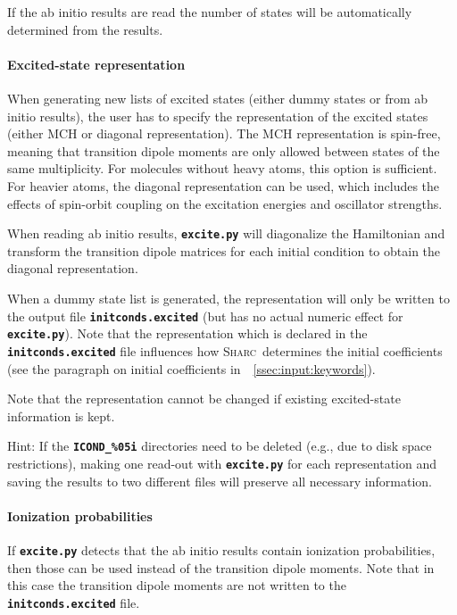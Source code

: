 \documentclass[a4paper,11pt,DIV=15,openany,twoside=false]{scrbook}
\newcommand{\sharc}{\textsc{Sharc}}
\newcommand{\ttt}[1]{\textbf{\texttt{#1}}}
\begin{document}
If the ab initio results are read the number of states will be automatically determined from the results.

\paragraph{Excited-state representation}

When generating new lists of excited states (either dummy states or from ab initio results), the user has to specify the representation of the excited states (either MCH or diagonal representation). The MCH representation is spin-free, meaning that transition dipole moments are only allowed between states of the same multiplicity. For molecules without heavy atoms, this option is sufficient. For heavier atoms, the diagonal representation can be used, which includes the effects of spin-orbit coupling on the excitation energies and oscillator strengths. 

When reading ab initio results, \ttt{excite.py} will diagonalize the Hamiltonian and transform the transition dipole matrices for each initial condition to obtain the diagonal representation. 

When a dummy state list is generated, the representation will only be written to the output file \ttt{initconds.excited} (but has no actual numeric effect for \ttt{excite.py}). Note that the representation which is declared in the \ttt{initconds.excited} file influences how \sharc\ determines the initial coefficients (see the paragraph on initial coefficients in~~\ref{ssec:input:keywords}).

Note that the representation cannot be changed if existing excited-state information is kept. 

Hint: If the \ttt{ICOND\_\%05i} directories need to be deleted (e.g., due to disk space restrictions), making one read-out with \ttt{excite.py} for each representation and saving the results to two different files will preserve all necessary information.

\paragraph{Ionization probabilities}

If \ttt{excite.py} detects that the ab initio results contain ionization probabilities, then those can be used instead of the transition dipole moments. Note that in this case the transition dipole moments are not written to the \ttt{initconds.excited} file. 
\end{document}
